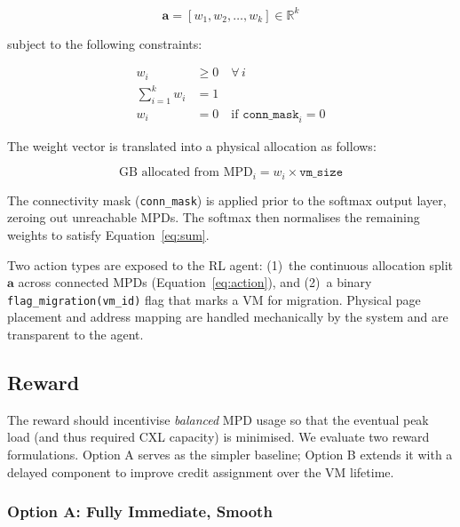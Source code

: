 \documentclass[11pt]{article}
\begin{document}
\begin{equation}
    \mathbf{a} = [w_1, w_2, \ldots, w_k] \in \mathbb{R}^k
    \label{eq:action}
\end{equation}

subject to the following constraints:

\begin{align}
    w_i &\geq 0 \quad \forall\, i \label{eq:nonneg} \\
    \sum_{i=1}^{k} w_i &= 1 \label{eq:sum} \\
    w_i &= 0 \quad \text{if } \texttt{conn\_mask}_i = 0 \label{eq:mask}
\end{align}

The weight vector is translated into a physical allocation as follows:

\begin{equation}
    \text{GB allocated from MPD}_i = w_i \times \texttt{vm\_size}
    \label{eq:alloc}
\end{equation}

The connectivity mask (\texttt{conn\_mask}) is applied prior to the softmax
output layer, zeroing out unreachable MPDs. The softmax then normalises the
remaining weights to satisfy Equation~\ref{eq:sum}.

Two action types are exposed to the RL agent: (1)~the continuous allocation
split $\mathbf{a}$ across connected MPDs (Equation~\ref{eq:action}), and
(2)~a binary \texttt{flag\_migration(vm\_id)} flag that marks a VM for
migration. Physical page placement and address mapping are handled
mechanically by the system and are transparent to the agent.

\subsection{Reward}
\label{sec:reward}

The reward should incentivise \emph{balanced} MPD usage so that the eventual
peak load (and thus required CXL capacity) is minimised. We evaluate two
reward formulations. Option A serves as the simpler baseline; Option B
extends it with a delayed component to improve credit assignment over the
VM lifetime.

\subsubsection*{Option A: Fully Immediate, Smooth}
\end{document}
